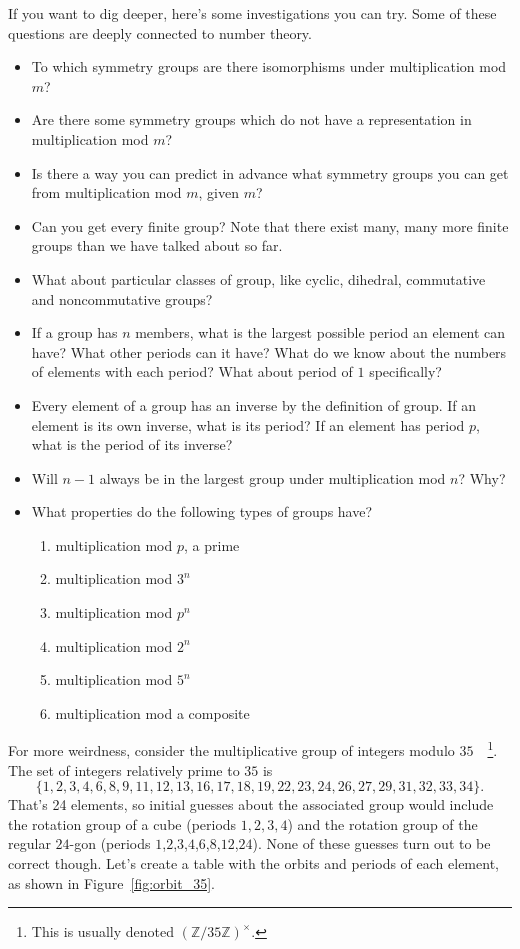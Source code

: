 \documentclass[../gatm.tex]{subfiles}
\begin{document}
If you want to dig deeper, here's some investigations you can try. Some of these questions are deeply connected to number theory.
\begin{itemize}
\item To which symmetry groups are there isomorphisms under multiplication mod $m$?
\item Are there some symmetry groups which do not have a representation in multiplication mod $m$?
\item Is there a way you can predict in advance what symmetry groups you can get from multiplication mod $m$, given $m$?
\item Can you get every finite group? Note that there exist many, many more finite groups than we have talked about so far.
\item What about particular classes of group, like cyclic, dihedral, commutative and noncommutative groups?
\item If a group has $n$ members, what is the largest possible period an element can have? What other periods can it have? What do we know about the numbers of elements with each period? What about period of $1$ specifically?
\item Every element of a group has an inverse by the definition of group. If an element is its own inverse, what is its period? If an element has period $p$, what is the period of its inverse?
\item Will $n-1$ always be in the largest group under multiplication mod $n$? Why?
\item What properties do the following types of groups have?
\begin{multicols}{2}
\begin{enumerate}
\item multiplication mod $p$, a prime
\item multiplication mod $3^n$
\item multiplication mod $p^n$
\item multiplication mod $2^n$
\item multiplication mod $5^n$
\item multiplication mod a composite
\end{enumerate}
\end{multicols}
\end{itemize}
For more weirdness, consider the multiplicative group of integers modulo $35\quad$\footnote{This is usually denoted $(\mathbb{Z}/35\mathbb{Z})^\times$.}. The set of integers relatively prime to $35$ is $$\{1,2,3,4,6,8,9,11,12,13,16,17,18,19,22,23,24,26,27,29,31,32,33,34\}.$$ That's 24 elements, so initial guesses about the associated group would include the rotation group of a cube (periods $1,2,3,4$) and the rotation group of the regular $24$-gon (periods $1$,$2$,$3$,$4$,$6$,$8$,$12$,$24$). None of these guesses turn out to be correct though. Let's create a table with the orbits and periods of each element, as shown in Figure~\ref{fig:orbit_35}.
\end{document}
